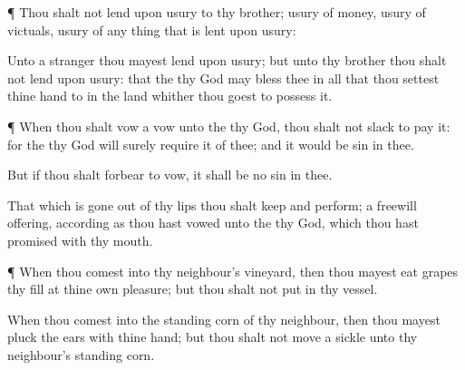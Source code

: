 {\par }{\PP {}¶ Thou shalt not lend upon
usury to thy
brother;
usury of
money,
usury of
victuals,
usury of any
thing that is lent upon
usury:

Unto a
stranger thou mayest lend upon
usury; but unto thy
brother thou shalt not lend upon
usury: that the
{} thy
God may
bless thee in all that thou
settest thine
hand to in the
land whither thou
goest to
possess it.


\par }{\PP {}¶ When thou shalt
vow a
vow unto the
{} thy
God, thou shalt not
slack to
pay it: for the
{} thy
God will
surely
require it of thee; and it would be
sin in thee.

But if thou shalt
forbear to
vow, it shall be no
sin in thee.

That which is gone
out of thy
lips thou shalt
keep and
perform;
{} a freewill
offering, according as thou hast
vowed unto the
{} thy
God, which thou hast
promised with thy
mouth.


\par }{\PP {}¶ When thou
comest into thy
neighbour’s
vineyard, then thou mayest
eat
grapes thy
fill at thine own
pleasure; but thou shalt not
put
{} in thy
vessel.

When thou
comest into the standing
corn of thy
neighbour, then thou mayest
pluck the
ears with thine
hand; but thou shalt not
move a
sickle unto thy
neighbour’s standing
corn.




\par }
